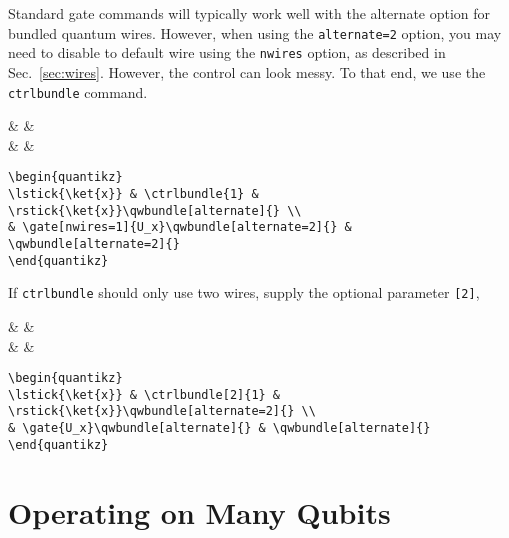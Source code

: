 \documentclass[aps,pra,10pt,nofootinbib]{revtex4}
\begin{document}
Standard gate commands will typically work well with the alternate option for bundled quantum wires. However, when using the \texttt{alternate=2} option, you may need to disable to default wire using the \texttt{nwires} option, as described in Sec.\ \ref{sec:wires}. However, the control can look messy. To that end, we use the \texttt{ctrlbundle} command.
\begin{Code}
\begin{center}
\begin{quantikz}
 &  & \qwbundle[alternate]{} \\
& \qwbundle[alternate=2]{} & \qwbundle[alternate=2]{}
\end{quantikz}
\end{center}
\tcblower
\begin{lstlisting}
\begin{quantikz}
\lstick{\ket{x}} & \ctrlbundle{1} & \rstick{\ket{x}}\qwbundle[alternate]{} \\
& \gate[nwires=1]{U_x}\qwbundle[alternate=2]{} & \qwbundle[alternate=2]{}
\end{quantikz}
\end{lstlisting}
\end{Code}
If \texttt{ctrlbundle} should only use two wires, supply the optional parameter \texttt{[2]},
\begin{Code}
\begin{center}
\begin{quantikz}
 &  & \qwbundle[alternate=2]{} \\
& \qwbundle[alternate]{} & \qwbundle[alternate]{}
\end{quantikz}
\end{center}
\tcblower
\begin{lstlisting}
\begin{quantikz}
\lstick{\ket{x}} & \ctrlbundle[2]{1} & \rstick{\ket{x}}\qwbundle[alternate=2]{} \\
& \gate{U_x}\qwbundle[alternate]{} & \qwbundle[alternate]{}
\end{quantikz}
\end{lstlisting}
\end{Code}

\section{Operating on Many Qubits}
\end{document}
